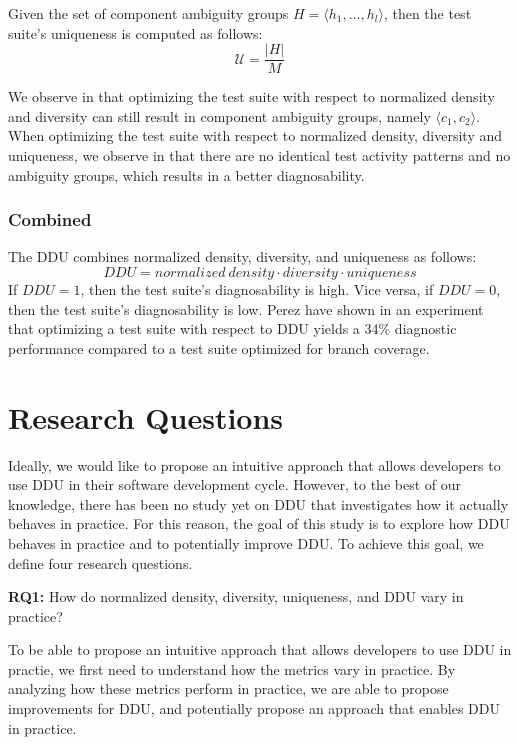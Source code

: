 \documentclass[twoside,a4paper,11pt]{memoir}
\begin{document}
Given the set of component ambiguity groups $H = \langle h_1, \dots, h_l \rangle$, then the test suite's uniqueness is computed as follows:
\begin{equation}
  \label{eq:uniqueness}
  \mathcal{U} = \frac{|H|}{M}
\end{equation}

We observe in  that optimizing the test suite with respect to normalized density and diversity can still result in component ambiguity groups, namely $\langle c_1, c_2 \rangle$.
When optimizing the test suite with respect to normalized density, diversity and uniqueness, we observe in  that there are no identical test activity patterns and no ambiguity groups, which results in a better diagnosability.

\subsection{Combined}
The DDU combines normalized density, diversity, and uniqueness as follows:
\begin{equation}
 DDU = normalized\ density \cdot diversity \cdot uniqueness
\end{equation}
If $DDU = 1$, then the test suite's diagnosability is high.
Vice versa, if $DDU = 0$, then the test suite's diagnosability is low.
Perez \etal \cite{DBLP:conf/icse/PerezAD17} have shown in an experiment that optimizing a test suite with respect to DDU yields a 34\% diagnostic performance compared to a test suite optimized for branch coverage.



\chapter{Research Questions}
\label{ch:research_questions}
Ideally, we would like to propose an intuitive approach that allows developers to use DDU in their software development cycle.
However, to the best of our knowledge, there has been no study yet on DDU that investigates how it actually behaves in practice.
For this reason, the goal of this study is to explore how DDU behaves in practice and to potentially improve DDU.
To achieve this goal, we define four research questions.

\begin{framed}
\noindent
\textbf{RQ1:} How do normalized density, diversity, uniqueness, and DDU vary in practice?
\end{framed}
To be able to propose an intuitive approach that allows developers to use DDU in practie, we first need to understand how the metrics vary in practice.
By analyzing how these metrics perform in practice, we are able to propose improvements for DDU, and potentially propose an approach that enables DDU in practice.
\end{document}
